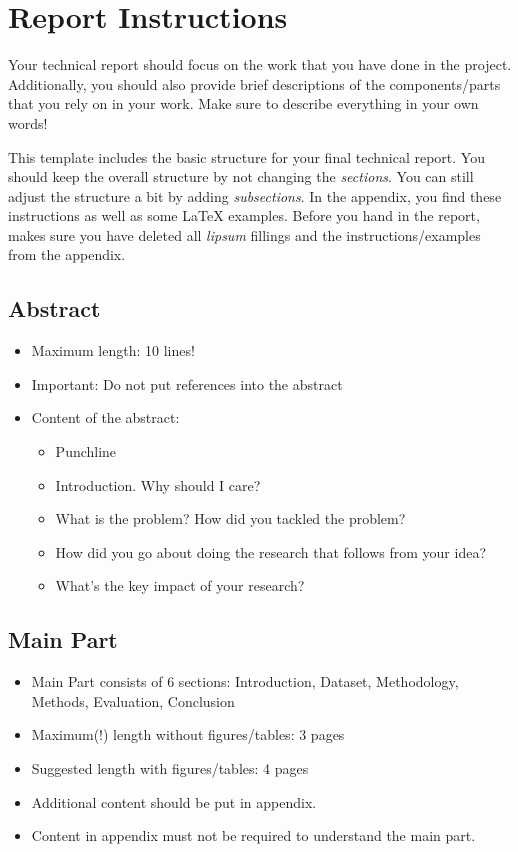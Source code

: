 \appendix
\section{Report Instructions}
\label{sec:appendix}
Your technical report should focus on the work that you have done in the project. Additionally, you should also provide brief descriptions of the components/parts that you rely on in your work. Make sure to describe everything in your own words!

This template includes the basic structure for your final technical report. You should keep the overall structure by not changing the \textit{sections}. You can still adjust the structure a bit by adding \textit{subsections}. In the appendix, you find these instructions as well as some \LaTeX{} examples. Before you hand in the report, makes sure you have deleted all \textit{lipsum} fillings and the instructions/examples from the appendix.



\subsection*{Abstract}
\begin{itemize}
    \item Maximum length: 10 lines!
    \item Important: Do not put references into the abstract
    \item Content of the abstract:
        \begin{itemize}
        \item Punchline
        \item Introduction. Why should I care?
        \item What is the problem? How did you tackled the problem?
        \item How did you go about doing the research that follows from your idea?
        \item What’s the key impact of your research?
    \end{itemize}
\end{itemize}


\subsection*{Main Part}
\begin{itemize}
    \item Main Part consists of 6 sections: Introduction, Dataset, Methodology, Methods, Evaluation, Conclusion
    \item Maximum(!) length without figures/tables: 3 pages
    \item Suggested length with figures/tables: 4 pages
    \item Additional content should be put in appendix.
    \item Content in appendix must not be required to understand the main part.
\end{itemize}


